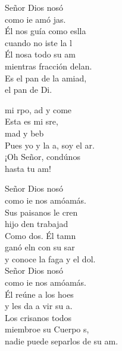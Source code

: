 \begin{cancion}%
	 Señor Dios nosó\\
	como ie amó jas.\\
	Él nos guía como eslla\\
	cuando no iste la l \\
	Él nosa todo su am \\
	mientras fracción delan.\\
	Es el pan de la amiad,\\
	el pan de Di.    \jump\\
	\begin{chorus}%
		 mi rpo, ad y come \\
		Esta es mi sre,\\
		mad y beb \\
		Pues yo y la a, soy el ar.\\
		¡Oh Señor, condúnos\\
		hasta tu am!    \jump\\
	\end{chorus}%
	 Señor Dios nosó\\
	como ie nos amóamás.\\
	Sus paisanos le cren\\
	hijo den trabajad \\
	Como dos. Él tamn\\
	ganó eln con su sar\\
	y conoce la faga y el dol.  \\
	\jump
	 Señor Dios nosó\\
	como ie nos amóamás.\\
	Él reúne a los hoes\\
	y les da a vir su a.\\
	Los crisanos todos  \\
	miembroe su Cuerpo s,\\
	nadie puede separlos de su am.  \\
	\jump
\end{cancion}%
